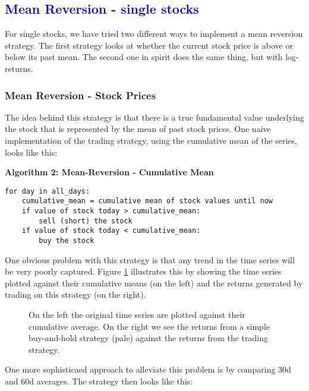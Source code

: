 \subsection{\textcolor{blue}{Mean Reversion - single stocks}}
For single stocks, we have tried two different ways to implement a mean reversion strategy. The first strategy looks at whether the current stock price is above or below its past mean. The second one in spirit does the same thing, but with log-returns. 

\subsubsection{Mean Reversion - Stock Prices}
The idea behind this strategy is that there is a true fundamental value underlying the stock that is represented by the mean of past stock prices. One naive implementation of the trading strategy, using the cumulative mean of the series, looks like this: 

\vspace{2ex}
\textbf{\small{Algorithm 2: Mean-Reversion - Cumulative Mean}}
\vspace{-1ex}
\begin{verbatim}
for day in all_days: 
    cumulative_mean = cumulative mean of stock values until now
    if value of stock today > cumulative_mean:
        sell (short) the stock
    if value of stock today < cumulative_mean:
        buy the stock
\end{verbatim}

One obvious problem with this strategy is that any trend in the time series will be very poorly captured. Figure \ref{fig:mean_reversion_cum_mean} illustrates this by showing the time series plotted against their cumulative means (on the left) and the returns generated by trading on this strategy (on the right). 
\begin{figure}[h!]
    \centering
    \begin{minipage}[b]{0.49\textwidth}
        \centering
            \begin{adjustbox}{width=\textwidth,center, scale={1}{0.9}}
                
            \end{adjustbox}
    \end{minipage}
    \hfill
    \begin{minipage}[b]{0.49\textwidth}
        \centering
        \begin{adjustbox}{width=\textwidth,center, scale={1}{1.2}}
            
        \end{adjustbox}
    \end{minipage}
    \caption{On the left the original time series are plotted against their cumulative average. On the right we see the returns from a simple buy-and-hold strategy (pale) against the returns from the trading strategy.}
    \label{fig:mean_reversion_cum_mean}
\end{figure}{}
One more sophisticaed approach to alleviate this problem is by comparing 30d and 60d averages. The strategy then looks like this: 

